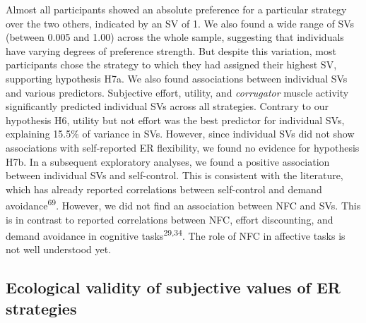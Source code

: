 \documentclass[
  man,floatsintext]{apa6}
\begin{document}
Almost all participants showed an absolute preference for a particular strategy over the two others, indicated by an SV of 1.
We also found a wide range of SVs (between 0.005 and 1.00) across the whole sample, suggesting that individuals have varying degrees of preference strength.
But despite this variation, most participants chose the strategy to which they had assigned their highest SV, supporting hypothesis H7a.
We also found associations between individual SVs and various predictors.
Subjective effort, utility, and \emph{corrugator} muscle activity significantly predicted individual SVs across all strategies.
Contrary to our hypothesis H6, utility but not effort was the best predictor for individual SVs, explaining 15.5\% of variance in SVs.
However, since individual SVs did not show associations with self-reported ER flexibility, we found no evidence for hypothesis H7b.
In a subsequent exploratory analyses, we found a positive association between individual SVs and self-control.
This is consistent with the literature, which has already reported correlations between self-control and demand avoidance\textsuperscript{69}.
However, we did not find an association between NFC and SVs.
This is in contrast to reported correlations between NFC, effort discounting, and demand avoidance in cognitive tasks\textsuperscript{29,34}.
The role of NFC in affective tasks is not well understood yet.

\hypertarget{ecological-validity-of-subjective-values-of-er-strategies}{%
\subsection{Ecological validity of subjective values of ER strategies}\label{ecological-validity-of-subjective-values-of-er-strategies}}
\end{document}
